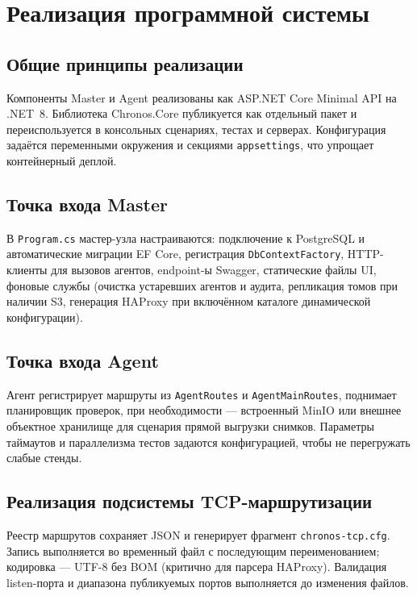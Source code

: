 \section{Реализация программной системы}
\label{sec:impl}

\subsection{Общие принципы реализации}

Компоненты Master и Agent реализованы как ASP.NET Core Minimal API на .NET~8. Библиотека Chronos.Core публикуется как отдельный пакет и переиспользуется в консольных сценариях, тестах и серверах. Конфигурация задаётся переменными окружения и секциями \texttt{appsettings}, что упрощает контейнерный деплой.

\subsection{Точка входа Master}

В \texttt{Program.cs} мастер-узла настраиваются: подключение к PostgreSQL и автоматические миграции EF Core, регистрация \texttt{DbContextFactory}, HTTP-клиенты для вызовов агентов, endpoint-ы Swagger, статические файлы UI, фоновые службы (очистка устаревших агентов и аудита, репликация томов при наличии S3, генерация HAProxy при включённом каталоге динамической конфигурации).

\subsection{Точка входа Agent}

Агент регистрирует маршруты из \texttt{AgentRoutes} и \texttt{AgentMainRoutes}, поднимает планировщик проверок, при необходимости --- встроенный MinIO или внешнее объектное хранилище для сценария прямой выгрузки снимков. Параметры таймаутов и параллелизма тестов задаются конфигурацией, чтобы не перегружать слабые стенды.

\subsection{Реализация подсистемы TCP-маршрутизации}

Реестр маршрутов сохраняет JSON и генерирует фрагмент \texttt{chronos-tcp.cfg}. Запись выполняется во временный файл с последующим переименованием; кодировка --- UTF-8 без BOM (критично для парсера HAProxy). Валидация listen-порта и диапазона публикуемых портов выполняется до изменения файлов.

